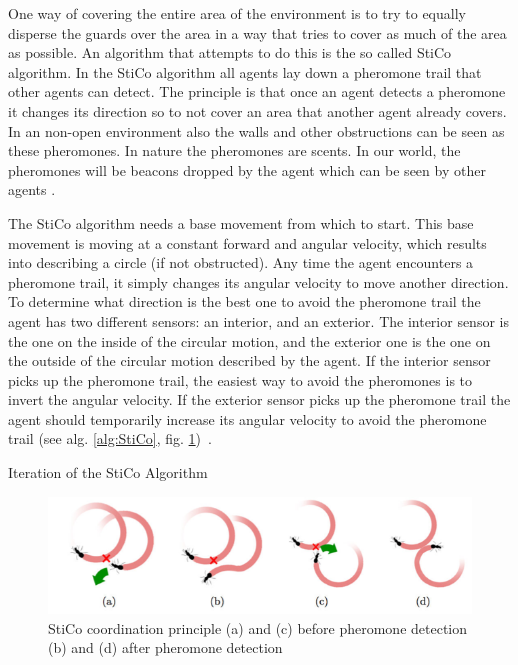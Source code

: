 
One way of covering the entire area of the environment is to try to equally disperse the guards over the area in a way that tries to cover as much of the area as possible. An algorithm that attempts to do this is the so called StiCo algorithm. In the StiCo algorithm all agents lay down a pheromone trail that other agents can detect. The principle is that once an agent detects a pheromone it changes its direction so to not cover an area that another agent already covers. In an non-open environment also the walls and other obstructions can be seen as these pheromones. In nature the pheromones are scents. In our world, the pheromones will be beacons dropped by the agent which can be seen by other agents \cite{ranjbar2012multi}.

The StiCo algorithm needs a base movement from which to start. This base movement is moving at a constant forward and angular velocity, which results into describing a circle (if not obstructed). Any time the agent encounters a pheromone trail, it simply changes its angular velocity to move another direction. To determine what direction is the best one to avoid the pheromone trail the agent has two different sensors: an interior, and an exterior. The interior sensor is the one on the inside of the circular motion, and the exterior one is the one on the outside of the circular motion described by the agent. If the interior sensor picks up the pheromone trail, the easiest way to avoid the pheromones is to invert the angular velocity. If the exterior sensor picks up the pheromone trail the agent should temporarily increase its angular velocity to avoid the pheromone trail (see alg. \ref{alg:StiCo}, fig. \ref{fig:movingDirections})~\cite{ranjbar2012multi}.

\begin{algorithm}
\label{alg:StiCo}
\caption{Iteration of the StiCo Algorithm~\protect\cite{ranjbar2012multi}}
\end{algorithm}

\begin{figure}
\centering
\includegraphics[width=\columnwidth]{images/stico.png}
\caption{StiCo coordination principle (a) and (c) before pheromone detection (b) and (d) after pheromone detection~\protect\cite{ranjbar2012multi}}
\label{fig:movingDirections}
\end{figure}

